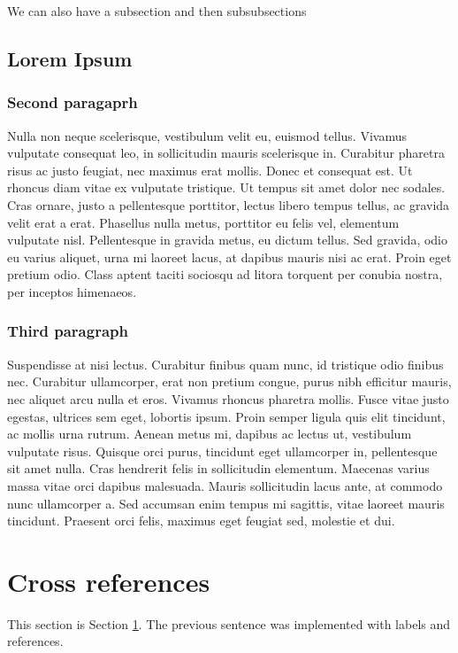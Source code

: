 \documentclass[11pt]{article}
\begin{document}
We can also have a subsection and then subsubsections

\subsection{Lorem Ipsum}
\subsubsection{Second paragaprh}
Nulla non neque scelerisque, vestibulum velit eu, euismod tellus. Vivamus vulputate consequat leo, in sollicitudin mauris scelerisque in. Curabitur pharetra risus ac justo feugiat, nec maximus erat mollis. Donec et consequat est. Ut rhoncus diam vitae ex vulputate tristique. Ut tempus sit amet dolor nec sodales. Cras ornare, justo a pellentesque porttitor, lectus libero tempus tellus, ac gravida velit erat a erat. Phasellus nulla metus, porttitor eu felis vel, elementum vulputate nisl. Pellentesque in gravida metus, eu dictum tellus. Sed gravida, odio eu varius aliquet, urna mi laoreet lacus, at dapibus mauris nisi ac erat. Proin eget pretium odio. Class aptent taciti sociosqu ad litora torquent per conubia nostra, per inceptos himenaeos.

\subsubsection{Third paragraph}
Suspendisse at nisi lectus. Curabitur finibus quam nunc, id tristique odio finibus nec. Curabitur ullamcorper, erat non pretium congue, purus nibh efficitur mauris, nec aliquet arcu nulla et eros. Vivamus rhoncus pharetra mollis. Fusce vitae justo egestas, ultrices sem eget, lobortis ipsum. Proin semper ligula quis elit tincidunt, ac mollis urna rutrum. Aenean metus mi, dapibus ac lectus ut, vestibulum vulputate risus. Quisque orci purus, tincidunt eget ullamcorper in, pellentesque sit amet nulla. Cras hendrerit felis in sollicitudin elementum. Maecenas varius massa vitae orci dapibus malesuada. Mauris sollicitudin lacus ante, at commodo nunc ullamcorper a. Sed accumsan enim tempus mi sagittis, vitae laoreet mauris tincidunt. Praesent orci felis, maximus eget feugiat sed, molestie et dui.

\obeycr



\section{Cross references}\label{sec:xref}
This section is Section \ref{sec:xref}.
The previous sentence was implemented with labels and references.
\restorecr
\end{document}
